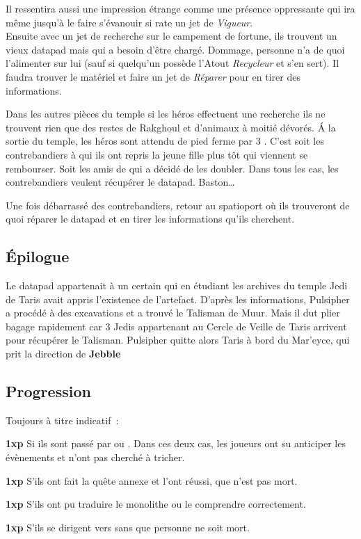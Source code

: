 Il ressentira aussi une impression étrange comme une présence oppressante qui ira même jusqu’à le faire s’évanouir si rate un jet de \textit{Vigueur}.\\

Ensuite avec un jet de recherche sur le campement de fortune, ils trouvent un vieux datapad mais qui a besoin d’être chargé. Dommage, personne n’a de quoi l’alimenter sur lui (sauf si quelqu’un possède l’Atout \emph{Recycleur} et s’en sert). Il faudra trouver le matériel et faire un jet de \emph{Réparer} pour en tirer des informations.

Dans les autres pièces du temple si les héros effectuent une recherche ils ne trouvent rien que des restes de Rakghoul et d’animaux à moitié dévorés.
\'A la sortie du temple, les héros sont attendu de pied ferme par 3 . C’est soit les contrebandiers à qui ils ont repris la jeune fille plus tôt qui viennent se rembourser. Soit les amis de  qui a décidé de les doubler. Dans tous les cas, les contrebandiers veulent récupérer le datapad. Baston\ldots

Une fois débarrassé des contrebandiers, retour au spatioport où ils trouveront de quoi réparer le datapad et en tirer les informations qu’ils cherchent.

\clearpage
\subsection{\'Epilogue}
Le datapad appartenait à un certain  qui en étudiant les archives du temple Jedi de Taris avait appris l’existence de l’artefact. D’après les informations, Pulsipher a procédé à des excavations et a trouvé le Talisman de Muur. Mais il dut plier bagage rapidement car 3 Jedis appartenant au Cercle de Veille de Taris arrivent pour récupérer le Talisman. Pulsipher quitte alors Taris à bord du Mar’eyce, qui prit la direction de \textbf{Jebble}

\subsection{Progression}
Toujours à titre indicatif~:
\begin{rebelist}
    \item \textbf{1xp} Si ils sont passé par  ou . Dans ces deux cas, les joueurs ont su anticiper les évènements et n’ont pas cherché à tricher.
    \item \textbf{1xp} S’ils ont fait la quête annexe et l’ont réussi, que  n’est pas mort.
    \item \textbf{1xp} S’ils ont pu traduire le monolithe ou le comprendre correctement.
    \item \textbf{1xp} S’ils se dirigent vers  sans que personne ne soit mort.
\end{rebelist}

